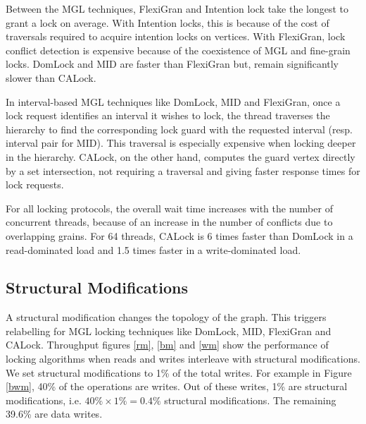 Between the MGL techniques, FlexiGran and Intention lock take the longest to grant a lock on average. With Intention locks, this is because of the cost of traversals required to acquire intention locks on vertices. With FlexiGran, lock conflict detection is expensive because of the coexistence of MGL and fine-grain locks. DomLock and MID are faster than FlexiGran but, remain significantly slower than CALock. 

In interval-based MGL techniques like DomLock, MID and FlexiGran, once a lock request identifies an interval it wishes to lock, the thread traverses the hierarchy to find the corresponding lock guard with the requested interval (resp. interval pair for MID). This traversal is especially expensive when locking deeper in the hierarchy. CALock, on the other hand, computes the guard vertex directly by a set intersection, not requiring a traversal and giving faster response times for lock requests. 

For all locking protocols, the overall wait time increases with the number of concurrent threads, because of an increase in the number of conflicts due to overlapping grains. For 64 threads, CALock is 6 times faster than DomLock in a read-dominated load and 1.5 times faster in a write-dominated load.







	



\subsection{Structural Modifications} \label{benchmark:DynamicOverallPerf}

A structural modification changes the topology of the graph. This triggers relabelling for MGL locking techniques like DomLock, MID, FlexiGran and CALock. 
Throughput figures \ref{rm}, \ref{bm} and \ref{wm} show the performance of locking algorithms when reads and writes interleave with structural modifications.
We set structural modifications to 1\% of the total writes.
For example in Figure \ref{bwm}, 40\% of the operations are writes. Out of these writes, 1\% are structural modifications, i.e. $40\% \times 1\%  = 0.4\%$ structural modifications. The remaining 39.6\% are data writes.


